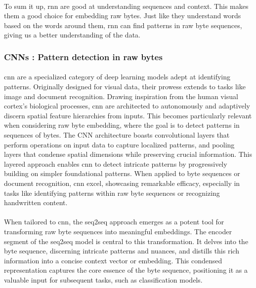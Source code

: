         \paragraph{}To sum it up, \acrshort{rnn} are good at understanding sequences and context. This makes them a good choice for embedding raw bytes. Just like they understand words based on the words around them, \acrshort{rnn} can find patterns in raw byte sequences, giving us a better understanding of the data.
    \subsubsection{CNNs : Pattern detection in raw bytes}
        \paragraph{}\acrfull{cnn}\cite{lecun_gradient-based_1998} are a specialized category of deep learning models adept at identifying patterns. Originally designed for visual data, their prowess extends to tasks like image and document recognition. Drawing inspiration from the human visual cortex's biological processes, \acrshort{cnn} are architected to autonomously and adaptively discern spatial feature hierarchies from inputs. This becomes particularly relevant when considering raw byte embedding, where the goal is to detect patterns in sequences of bytes. The CNN architecture boasts convolutional layers that perform operations on input data to capture localized patterns, and pooling layers that condense spatial dimensions while preserving crucial information. This layered approach enables \acrshort{cnn} to detect intricate patterns by progressively building on simpler foundational patterns. When applied to byte sequences or document recognition, \acrshort{cnn} excel, showcasing remarkable efficacy, especially in tasks like identifying patterns within raw byte sequences or recognizing handwritten content.

        \paragraph{}When tailored to \acrshort{cnn}, the \acrfull{seq2seq}\cite{gehring_convolutional_2017} approach emerges as a potent tool for transforming raw byte sequences into meaningful embeddings. The encoder segment of the \acrshort{seq2seq} model is central to this transformation. It delves into the byte sequence, discerning intricate patterns and nuances, and distills this rich information into a concise context vector or embedding. This condensed representation captures the core essence of the byte sequence, positioning it as a valuable input for subsequent tasks, such as classification models.

